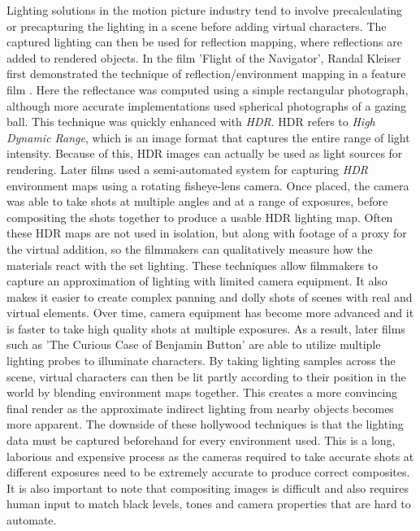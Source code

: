 \documentclass[ %
                    author={Gavin Parker},
                supervisor={Dr. Neill Campbell},
                    degree={MEng},
                     title={Deep Siamese Networks for Illumination Estimation from Stereo Images},
                  subtitle={},
                      type={Research},
                      year={2018} ]{dissertation}
\begin{document}
Lighting solutions in the motion picture industry tend to involve precalculating or precapturing the lighting in a scene before adding virtual characters. The captured lighting can then be used for reflection mapping, where reflections are added to rendered objects. In the film 'Flight of the Navigator', Randal Kleiser first demonstrated the technique of reflection/environment mapping in a feature film \cite{navigator}. Here the reflectance was computed using a simple rectangular photograph, although more accurate implementations used spherical photographs of a gazing ball. This technique was quickly enhanced with \textit{HDR}. HDR refers to \textit{High Dynamic Range}, which is an image format that captures the entire range of light intensity. Because of this, HDR images can actually be used as light sources for rendering. Later films used a semi-automated system for capturing \textit{HDR} environment maps using a rotating fisheye-lens camera. Once placed, the camera was able to take shots at multiple angles and at a range of exposures, before compositing the shots together to produce a usable HDR lighting map. Often these HDR maps are not used in isolation, but along with footage of a proxy for the virtual addition, so the filmmakers can qualitatively measure how the materials react with the set lighting. These techniques allow filmmakers to capture an approximation of lighting with limited camera equipment. It also makes it easier to create complex panning and dolly shots of scenes with real and virtual elements. Over time, camera equipment has become more advanced and it is faster to take high quality shots at multiple exposures. As a result, later films such as 'The Curious Case of Benjamin Button' are able to utilize multiple lighting probes to illuminate characters. By taking lighting samples across the scene, virtual characters can then be lit partly according to their position in the world by blending environment maps together. This creates a more convincing final render as the approximate indirect lighting from nearby objects becomes more apparent. The downside of these hollywood techniques is that the lighting data must be captured beforehand for every environment used. This is a long, laborious and expensive process as the cameras required to take accurate shots at different exposures need to be extremely accurate to produce correct composites. It is also important to note that compositing images is difficult and also requires human input to match black levels, tones and camera properties that are hard to automate.
\end{document}
